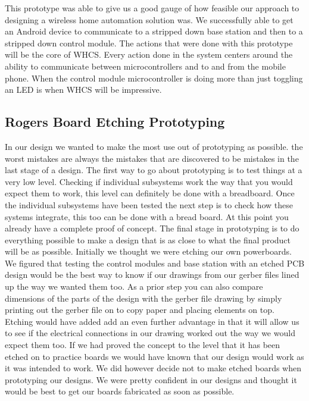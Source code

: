 This prototype was able to give us a good gauge of how feasible
our approach to designing a wireless home automation solution was. We
successfully able to get an Android device to communicate to a stripped down
base station and then to a stripped down control module. The actions that were
done with this prototype will be the core of WHCS. Every action done in the
system centers around the ability to communicate between microcontrollers and
to and from the mobile phone.  When the control module microcontroller is doing
more than just toggling an LED is when WHCS will be impressive.

\subsection{Rogers Board Etching Prototyping}
In our design we wanted to make the most use out of prototyping as possible.
the worst mistakes are always the mistakes that are discovered to be mistakes
in the last stage of a design. The first way to go about prototyping is to test
things at a very low level. Checking if individual subsystems work the way that
you would expect them to work, this level can definitely be done with a
breadboard. Once the individual subsystems have been tested the next step is to
check how these systems integrate, this too can be done with a bread board. At
this point you already have a complete proof of concept. The final stage in
prototyping is to do everything possible to make a design that is as close to
what the final product will be as possible. Initially we thought we were etching our own powerboards. We figured that testing the control
modules and base station with an etched PCB design would be the best way to
know if our drawings from our gerber files lined up the way we wanted them too.
As a prior step you can also compare dimensions of the parts of the design with
the gerber file drawing by simply printing out the gerber file on to copy paper
and placing elements on top. Etching would have added add an even further advantage
in that it will allow us to see if the electrical connections in our drawing
worked out the way we would expect them too. If we had proved the concept to
the level that it has been etched on to practice boards we would have known that our design
would work as it was intended to work. We did however decide not to make etched boards when prototyping our designs. We were pretty confident in our designs and thought it would be best to get our boards fabricated as soon as possible.

